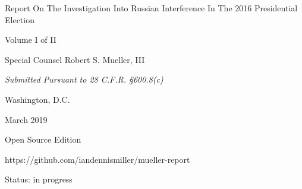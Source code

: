 \thispagestyle{empty}

\begin{center}
\Huge
Report On The Investigation Into Russian Interference In The 2016 Presidential Election

\vspace{10 mm}

\large
Volume I of II

\vspace{10 mm}

Special Counsel Robert S. Mueller, III

\vspace{10 mm}

\normalsize

\textit{Submitted Pursuant to 28 C.F.R. \S 600.8(c)}

\vspace{20 mm}

Washington, D.C.

\vspace{10 mm}

March 2019

\vspace{10 mm}

\large
Open Source Edition

https://github.com/iandennismiller/mueller-report

Status: in progress

\end{center}

\newpage
